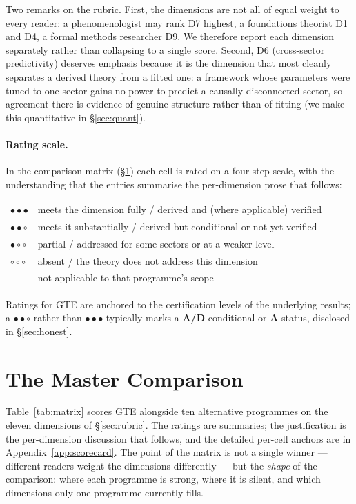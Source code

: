 \documentclass[11pt]{article}
\newcommand{\CatA}{\textbf{A}}
\newcommand{\CatAD}{\textbf{A/D}}
\newcommand{\rFull}{\ensuremath{\bullet\bullet\bullet}}      %
\newcommand{\rStrong}{\ensuremath{\bullet\bullet\circ}}      %
\newcommand{\rPart}{\ensuremath{\bullet\circ\circ}}          %
\newcommand{\rNone}{\ensuremath{\circ\circ\circ}}            %
\newcommand{\rNA}{\textendash}                              %
\begin{document}
Two remarks on the rubric.  First, the dimensions are not all of equal weight to
every reader: a phenomenologist may rank D7 highest, a foundations theorist D1 and
D4, a formal methods researcher D9.  We therefore report each dimension separately
rather than collapsing to a single score.  Second, D6 (cross-sector predictivity)
deserves emphasis because it is the dimension that most cleanly separates a derived
theory from a fitted one: a framework whose parameters were tuned to one sector
gains no power to predict a causally disconnected sector, so agreement there is
evidence of genuine structure rather than of fitting (we make this quantitative in
§\ref{sec:quant}).

\paragraph{Rating scale.}  In the comparison matrix (§\ref{sec:matrix}) each cell
is rated on a four-step scale, with the understanding that the entries summarise
the per-dimension prose that follows:
\begin{center}
\small
\begin{tabular}{@{}ll@{}}
\rFull & meets the dimension fully / derived and (where applicable) verified \\
\rStrong & meets it substantially / derived but conditional or not yet verified \\
\rPart & partial / addressed for some sectors or at a weaker level \\
\rNone & absent / the theory does not address this dimension \\
\rNA & not applicable to that programme's scope \\
\end{tabular}
\end{center}
Ratings for GTE are anchored to the certification levels of the underlying
results; a \rStrong{} rather than \rFull{} typically marks a \CatAD-conditional or
\CatA{} status, disclosed in §\ref{sec:honest}.

\section{The Master Comparison}
\label{sec:matrix}

Table~\ref{tab:matrix} scores GTE alongside ten alternative programmes on the
eleven dimensions of §\ref{sec:rubric}.  The ratings are summaries; the
justification is the per-dimension discussion that follows, and the detailed
per-cell anchors are in Appendix~\ref{app:scorecard}.  The point of the matrix is
not a single winner --- different readers weight the dimensions differently --- but
the \emph{shape} of the comparison: where each programme is strong, where it is
silent, and which dimensions only one programme currently fills.
\end{document}
